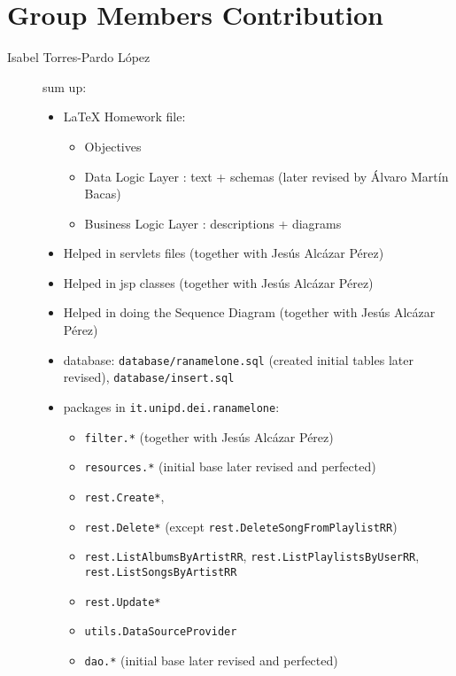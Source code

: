 \section{Group Members Contribution}


\begin{description}

    \item[Isabel Torres-Pardo López] sum up:
    \begin{itemize}
        \item LaTeX Homework file:
        \begin{itemize}
            \item Objectives
            \item Data Logic Layer : text + schemas (later revised by Álvaro Martín Bacas)
            \item Business Logic Layer : descriptions + diagrams
        \end{itemize}
        \item Helped in servlets files (together with Jesús Alcázar Pérez)
        \item Helped in jsp classes (together with Jesús Alcázar Pérez)
        \item Helped in doing the Sequence Diagram (together with Jesús Alcázar Pérez)
        \item database: \verb|database/ranamelone.sql| (created initial tables later revised), \verb|database/insert.sql|
        \item packages in \verb|it.unipd.dei.ranamelone|:
        \begin{itemize}
            \item \verb|filter.*| (together with Jesús Alcázar Pérez)
            \item \verb|resources.*| (initial base later revised and perfected)
            \item \verb|rest.Create*|, \item\verb|rest.Delete*| (except \verb|rest.DeleteSongFromPlaylistRR|)
            \item \verb|rest.ListAlbumsByArtistRR|, 
\verb|rest.ListPlaylistsByUserRR|, \verb|rest.ListSongsByArtistRR|
            \item \verb|rest.Update*|
            \item \verb|utils.DataSourceProvider|
            \item \verb|dao.*| (initial base later revised and perfected)
        \end{itemize}
    \end{itemize}


\end{description}
